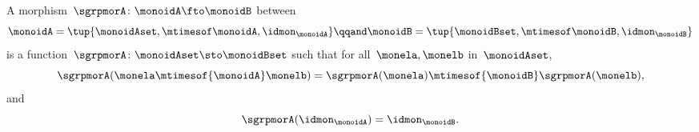 \begin{ctdefinition}
    \label{def:monoid-mor}
    A morphism~$\sgrpmorA\colon \monoidA \fto \monoidB$ between  \begin{equation}
        \monoidA = \tup{\monoidAset, \mtimesof\monoidA, \idmon_\monoidA}
        \qqand
        \monoidB = \tup{\monoidBset, \mtimesof\monoidB, \idmon_\monoidB}
    \end{equation}
    is a function~$\sgrpmorA \colon \monoidAset \sto \monoidBset$ such that for all~$\monela, \monelb$ in~$\monoidAset$,
    \begin{equation}
        \label{eq:mon-mor-comp}
        \sgrpmorA (\monela \mtimesof{\monoidA} \monelb) = \sgrpmorA (\monela) \mtimesof{\monoidB}  \sgrpmorA(\monelb),
    \end{equation}
    and
    \begin{equation}
        \label{eq:mon-id-comp}
        \sgrpmorA (\idmon_\monoidA) = \idmon_{\monoidB}.
    \end{equation}
\end{ctdefinition}
